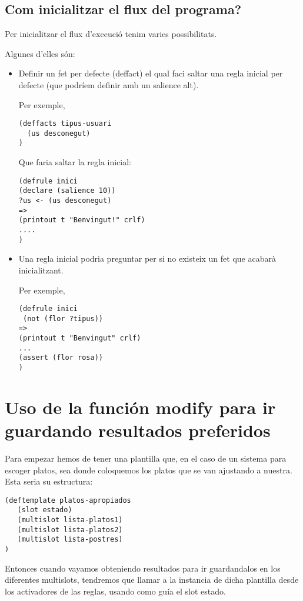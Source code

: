 \documentclass[11pt,svgnames]{scrbook}
\begin{document}
\subsection{Com inicialitzar el flux del programa?}


Per inicialitzar el flux d'execució tenim varies possibilitats.

Algunes d'elles són:
\begin{itemize}
\item Definir un fet per defecte (deffact) el qual faci saltar una regla inicial
per defecte (que podríem definir amb un salience alt).

Per exemple,

\begin{verbatim}
(deffacts tipus-usuari
  (us desconegut)
)
\end{verbatim}
Que faria saltar la regla inicial:

\begin{verbatim}
(defrule inici
(declare (salience 10))
?us <- (us desconegut)
=>
(printout t "Benvingut!" crlf)
....
)\end{verbatim}

\item Una regla inicial podria preguntar per si no existeix un fet que acabarà inicialitzant.

Per exemple,

\begin{verbatim}
(defrule inici
 (not (flor ?tipus))
=>
(printout t "Benvingut" crlf)
...
(assert (flor rosa))
)\end{verbatim}
\end{itemize}


\section{Uso de la función modify para ir guardando resultados preferidos}

Para empezar hemos de tener una plantilla que, en el caso de un sistema para escoger platos, sea donde coloquemos los platos que se van ajustando a nuestra. Esta seria su estructura:

\begin{verbatim}
(deftemplate platos-apropiados
   (slot estado)
   (multislot lista-platos1)
   (multislot lista-platos2)
   (multislot lista-postres)
)\end{verbatim}

Entonces cuando vayamos obteniendo resultados para ir guardandalos en los diferentes multislots, tendremos que llamar a la instancia de dicha plantilla desde los activadores de las reglas, usando como guía el slot estado.
\end{document}
